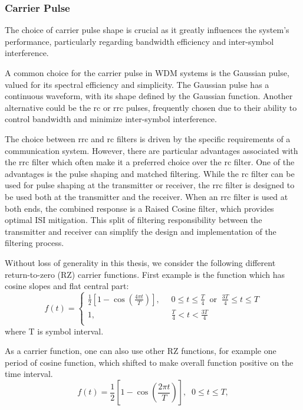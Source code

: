 \subsubsection{Carrier Pulse}
The choice of carrier pulse shape is crucial as it greatly influences the system's performance, particularly regarding bandwidth efficiency and inter-symbol interference.

A common choice for the carrier pulse in WDM systems is the Gaussian pulse, valued for its spectral efficiency and simplicity. The Gaussian pulse has a continuous waveform, with its shape defined by the Gaussian function. Another alternative could be the \gls{rc} or \gls{rrc} pulses, frequently chosen due to their ability to control bandwidth and minimize inter-symbol interference.

The choice between \Gls{rrc} and \Gls{rc} filters is driven by the specific requirements of a communication system. However, there are particular advantages associated with the \Gls{rrc} filter which often make it a preferred choice over the \Gls{rc} filter. One of the advantages is the pulse shaping and matched filtering. While the \Gls{rc} filter can be used for pulse shaping at the transmitter or receiver, the \Gls{rrc} filter is designed to be used both at the transmitter and the receiver. When an \Gls{rrc} filter is used at both ends, the combined response is a Raised Cosine filter, which provides optimal ISI mitigation. This split of filtering responsibility between the transmitter and receiver can simplify the design and implementation of the filtering process.


Without loss of generality in this thesis, we consider the following different return-to-zero (RZ) carrier functions. First example is the function which has cosine slopes and flat central part:
\begin{equation}
    f(t)=
    \left\{
        \begin{aligned}
        \frac{1}{2}\left[1 - \cos\left(\frac{4\pi t}{T}\right)\right] {,} & \; \; 0 \le t \le \frac{T}{4} \; \; \text{or} \; \; \frac{3T}{4} \le t \le T \\
        1 {,} & \; \; \frac{T}{4} < t < \frac{3T}{4} \\
        \end{aligned}
    \right.
    \label{eq:wdm_carrier}
\end{equation}
where {T} is symbol interval.

As a carrier function, one can also use other RZ functions, for example one period of cosine function, which shifted to make overall function positive on the time interval.
\begin{equation}
    f(t)=
    \frac{1}{2}\left[1 - \cos\left(\frac{2\pi t}{T}\right)\right] {,} \; \; 0 \le t \le T {,} 
    \label{eq:wdm_carrier2}
\end{equation}



